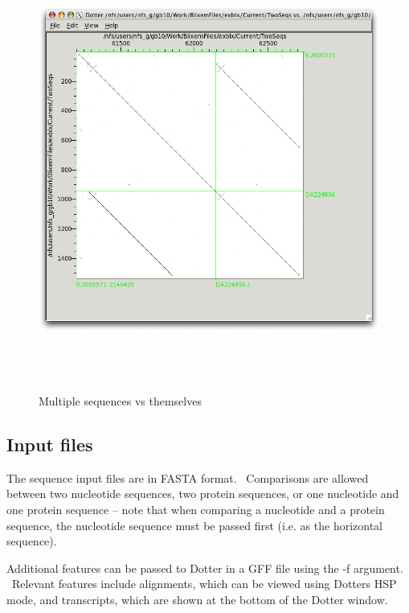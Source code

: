 \documentclass[letterpaper]{article}
\begin{document}
\begin{figure}
 \centering
 \color[rgb]{0.30980393,0.5058824,0.7411765}
 \includegraphics[width=15.24cm,height=14.508cm]{img_window_dotter_self.png}
 \caption{Multiple sequences vs themselves}
\end{figure}

\bigskip

{\color[rgb]{0.30980393,0.5058824,0.7411765}\subsection[Input files]{Input files}}
{The sequence input files are in FASTA format. \ Comparisons are allowed
between two nucleotide sequences, two protein sequences, or one
nucleotide and one protein sequence -- note that when comparing a
nucleotide and a protein sequence, the nucleotide sequence must be
passed first (i.e. as the horizontal sequence).}

\bigskip

{Additional features can be passed to Dotter in a GFF file using the {}-f
argument. \ Relevant features include alignments, which can be viewed
using Dotter{\textquotesingle}s HSP mode, and transcripts, which are
shown at the bottom of the Dotter window.}
\end{document}
